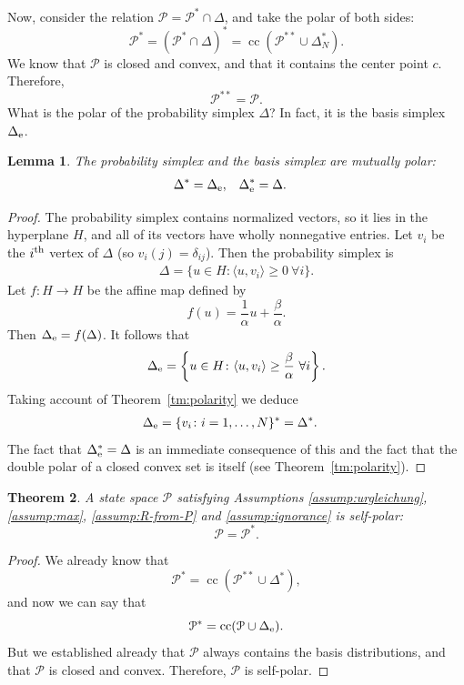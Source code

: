\documentclass[aps,pra,superscriptaddress,10pt,tightenlines,twocolumn,nofootinbib]{revtex4}
\newtheorem{theorem}{Theorem}
\newtheorem{lemma}[theorem]{Lemma}
\theoremstyle{remark}
\newcommand{\be}{\begin{equation}}
\newcommand{\ee}{\end{equation}}
\newcommand{\ea}[1]{\begin{align}#1\end{align}}
\newcommand{\la}{\langle}
\newcommand{\ra}{\rangle}
\newcommand{\bs}{\Delta_{\rm{e}}}
\newcommand{\ps}{\Delta}
\newcommand{\dl}[1]{#1^{*}}
\newcommand{\ddl}[1]{#1^{**}}
\newcommand{\cP}{\mathcal{P}}
\DeclareMathOperator{\cc}{cc}
\begin{document}
Now, consider the relation $\cP = \dl{\cP} \cap \Delta$, and take the polar of both sides:
\begin{equation}
\dl{\cP} = \dl{\left(\dl{\cP} \cap \Delta\right)} = \cc \left(\ddl{\cP} \cup \dl{\Delta_N}\right).
\end{equation}
We know that $\cP$ is closed and convex, and that it contains the center point $c$.  Therefore,
\begin{equation}
\ddl{\cP} = \cP.
\end{equation}
What is the polar of the probability simplex $\Delta$?  In fact, it is the basis simplex $\bs$.
\begin{lemma}
\label{lm:polar-basis}
The probability simplex and the basis simplex are mutually polar:
\ea{
\dl{\Delta} &= \bs, & \dl{\bs} &= \Delta.
}
\end{lemma}
\begin{proof}
The probability simplex contains normalized vectors, so it lies in the hyperplane $H$, and all of its vectors have wholly nonnegative entries.  Let $v_i$ be the $i^{\rm{th}}$ vertex of $\ps$ (so $v_i(j) = \delta_{ij}$).  Then the probability simplex is
\ea{
\ps = \{ u \in H \colon \la u, v_i\ra \ge 0 \ \forall i\}.
}
Let $f\colon H \to H$ be the affine map defined by
\be
f(u) = \frac{1}{\alpha} u  + \frac{\beta}{\alpha}.
\ee
Then $\bs = f(\ps)$.  It follows that
\ea{
\bs = \left\{u \in H \colon \la u, v_i \ra \ge \frac{\beta}{\alpha}
 \ \forall i \right\}.
}
Taking account of Theorem~\ref{tm:polarity}  we deduce
\ea{
\bs & = \dl{\{v_i \colon i = 1, \dots, N\}}
= \dl{\ps}.
}
The fact that $\dl{\bs} = \ps$ is an immediate consequence of this and the fact that the double polar of a closed convex set is itself (see Theorem~\ref{tm:polarity}).
\end{proof}

\begin{theorem}
A state space $\cP$ satisfying Assumptions \ref{assump:urgleichung}, \ref{assump:max}, \ref{assump:R-from-P} and \ref{assump:ignorance} is self-polar:
\begin{equation}
\cP = \dl{\cP}.
\end{equation}
\end{theorem}
\begin{proof}
We already know that
\begin{equation}
\dl{\cP} = \cc\left(\ddl{\cP} \cup \dl{\Delta}\right),
\end{equation}
and now we can say that
\begin{equation}
\dl{\cP} = \cc(\cP \cup \bs).
\end{equation}
But we established already that $\cP$ always contains the basis distributions, and that $\cP$ is closed and convex.  Therefore, $\cP$ is self-polar.
\end{proof}
\end{document}
